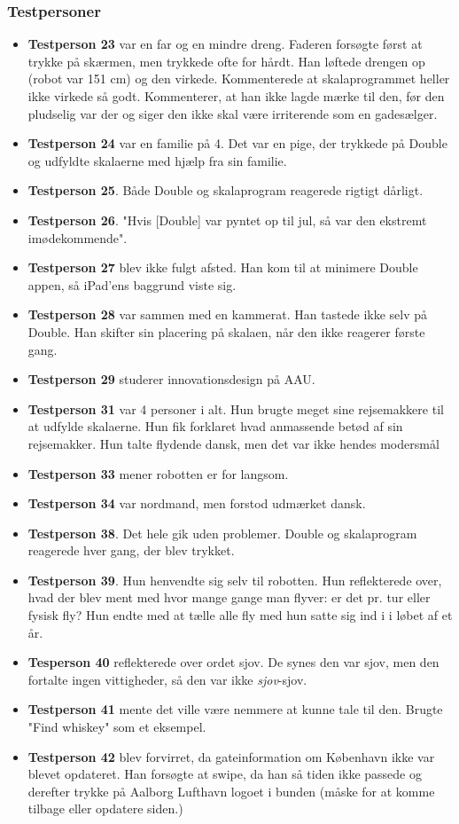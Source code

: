 \subsubsection{Testpersoner}
\begin{itemize}
\item \textbf{Testperson 23} var en far og en mindre dreng. Faderen forsøgte først at trykke på skærmen, men trykkede ofte for hårdt. Han løftede drengen op (robot var 151 cm) og den virkede. Kommenterede at skalaprogrammet heller ikke virkede så godt. Kommenterer, at han ikke lagde mærke til den, før den pludselig var der og siger den ikke skal være irriterende som en gadesælger.
\item \textbf{Testperson 24} var en familie på 4. Det var en pige, der trykkede på Double og udfyldte skalaerne med hjælp fra sin familie.
\item	\textbf{Testperson 25}. Både Double og skalaprogram reagerede rigtigt dårligt.
\item \textbf{Testperson 26}. "Hvis [Double] var pyntet op til jul, så var den ekstremt imødekommende".
\item \textbf{Testperson 27} blev ikke fulgt afsted. Han kom til at minimere Double appen, så iPad'ens baggrund viste sig.
\item \textbf{Testperson 28} var sammen med en kammerat. Han tastede ikke selv på Double. Han skifter sin placering på skalaen, når den ikke reagerer første gang.
\item \textbf{Testperson 29} studerer innovationsdesign på AAU.
\item	\textbf{Testperson 31} var 4 personer i alt. Hun brugte meget sine rejsemakkere til at udfylde skalaerne. Hun fik forklaret hvad anmassende betød af sin rejsemakker. Hun talte flydende dansk, men det var ikke hendes modersmål
\item \textbf{Testperson 33} mener robotten er for langsom.
\item \textbf{Testperson 34} var nordmand, men forstod udmærket dansk.
\item \textbf{Testperson 38}. Det hele gik uden problemer. Double og skalaprogram reagerede hver gang, der blev trykket.
\item \textbf{Testperson 39}. Hun henvendte sig selv til robotten. Hun reflekterede over, hvad der blev ment med hvor mange gange man flyver: er det pr. tur eller fysisk fly? Hun endte med at tælle alle fly med hun satte sig ind i i løbet af et år.
\item \textbf{Tesperson 40} reflekterede over ordet sjov. De synes den var sjov, men den fortalte ingen vittigheder, så den var ikke \textit{sjov}-sjov.
\item \textbf{Testperson 41} mente det ville være nemmere at kunne tale til den. Brugte "Find whiskey" som et eksempel.
\item \textbf{Testperson 42} blev forvirret, da gateinformation om København ikke var blevet opdateret. Han forsøgte at swipe, da han så tiden ikke passede og derefter trykke på Aalborg Lufthavn logoet i bunden (måske for at komme tilbage eller opdatere siden.)


\end{itemize}